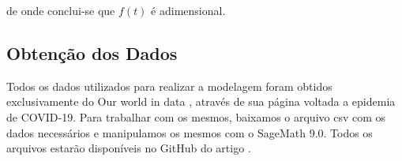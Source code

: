 \documentclass{article}
\begin{document}
\noindent de onde conclui-se que $f(t)$ é adimensional.

\subsection{Obtenção dos Dados}

Todos os dados utilizados para realizar a modelagem foram obtidos exclusivamente do Our world in data \cite{owid}, através de sua página voltada a epidemia de COVID-19. Para trabalhar com os mesmos, baixamos o arquivo csv com os dados necessários e manipulamos os mesmos com o SageMath 9.0. Todos os arquivos estarão disponíveis no GitHub do artigo \cite{github}.

\printbibliography
\end{document}
